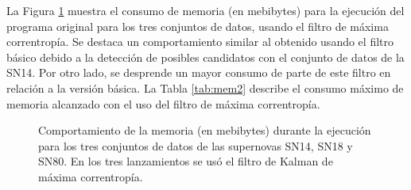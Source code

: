 La Figura \ref{fig:mem_mcc} muestra el consumo de memoria (en mebibytes) para la ejecuci\'on del programa original para los tres conjuntos de datos, usando el filtro de m\'axima correntrop\'ia. Se destaca un comportamiento similar al obtenido usando el filtro b\'asico debido a  la detecci\'on de posibles candidatos con el conjunto de datos de la SN14. Por otro lado, se desprende un mayor consumo de parte de este filtro en relaci\'on a la versi\'on b\'asica. La Tabla \ref{tab:mem2} describe el consumo m\'aximo de memoria alcanzado con el uso del filtro de m\'axima correntrop\'ia.
\bigskip

\begin{figure}[h!]
\centering
{}\hfill
{}\vfill
{}
\caption{Comportamiento de la memoria (en mebibytes) durante la ejecuci\'on para los tres conjuntos de datos de las supernovas SN14, SN18 y SN80. En los tres lanzamientos se us\'o el filtro de Kalman de  m\'axima correntrop\'ia.}
\label{fig:mem_mcc}
\end{figure}



